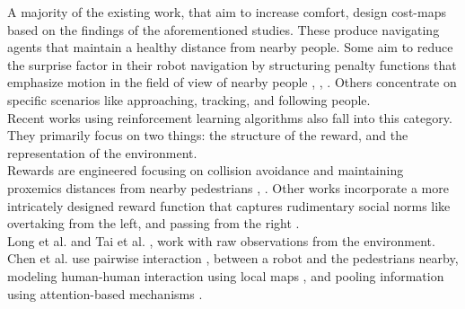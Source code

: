 A majority of the existing work, that aim to increase comfort, design cost-maps based on the findings of the aforementioned studies. These produce navigating agents that maintain a healthy distance from nearby people. Some aim to reduce the surprise factor in their robot navigation by structuring penalty functions that emphasize motion in the field of view of nearby people \cite{pandey_2010_human_centered_nav}, \cite{scandolo_2011}, \cite{sisbot_human_2007}.
Others concentrate on specific scenarios like approaching, tracking, and following people. \\

Recent works using reinforcement learning algorithms also fall into this category. They primarily focus on two things: the structure of the reward, and the representation of the environment. \\

Rewards are engineered focusing on collision avoidance and maintaining proxemics distances from nearby pedestrians \cite{chen_crowd_aware_robot_nav_with_attention}, \cite{chen_decentralized_non_communication_2017}. Other works incorporate a more intricately designed reward function that captures rudimentary social norms like overtaking from the left,  and passing from the right \cite{chen_socially_2017}. \\

 Long et al. \cite{long_2017_optimally_decentralized_collision_avoidance} and Tai et al. , \cite{tai_paolo_virtual_to_real_2017} work with raw observations from the environment. Chen et al. use pairwise interaction \cite{chen_crowd_aware_robot_nav_with_attention}, \cite{chen_decentralized_non_communication_2017} between a robot and the pedestrians nearby, modeling human-human interaction using local maps \cite{chen_crowd_aware_robot_nav_with_attention}, and pooling information using attention-based mechanisms \cite{chen_crowd_aware_robot_nav_with_attention}.

